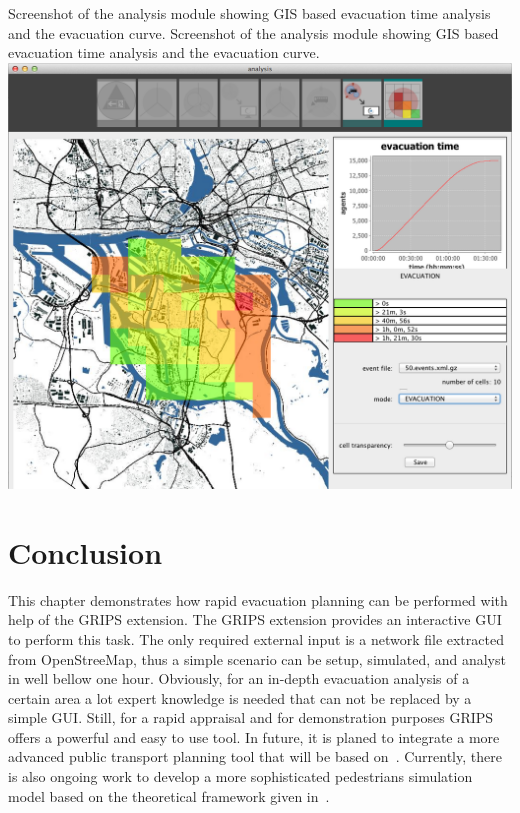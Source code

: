 \createfigure%
{Screenshot of the analysis module showing GIS based evacuation time analysis and the evacuation curve.}%
{Screenshot of the analysis module showing GIS based evacuation time analysis and the evacuation curve.}%
{\label{chap:evac:fig:analysis}}%
{\includegraphics[width=1\textwidth]{extending/figures/Evacuation/it50_evac_time}}
{}

\section{Conclusion}
\label{grips:outlook}
This chapter demonstrates how rapid evacuation planning can be performed with help of the GRIPS extension. The GRIPS extension provides an interactive GUI to perform this task.
The only required external input is a network file extracted from OpenStreeMap, thus a simple scenario can be setup, simulated, and analyst in well bellow one hour. Obviously, for an in-depth evacuation analysis of a certain area a lot expert knowledge is needed that can not be replaced by a simple GUI. Still, for a rapid appraisal and for demonstration purposes GRIPS offers a powerful and easy to use tool. In future, it is planed to integrate a more advanced public transport planning tool that will be based on~\cite{Neumann_PhDThesis_2014}. Currently, there is also ongoing work to develop a more sophisticated pedestrians simulation model based on the theoretical framework given in~\cite{FloetteroedLaemmel2014BiPedFnd}.

